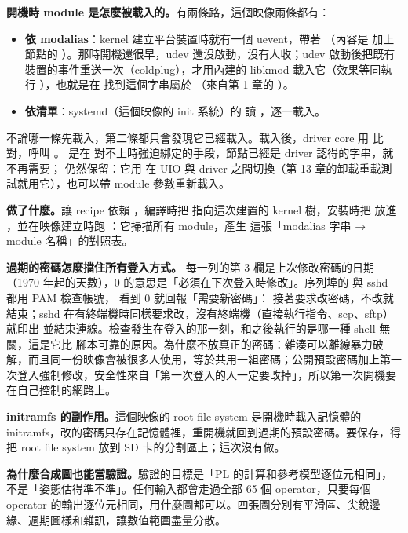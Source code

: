 \textbf{開機時 module 是怎麼被載入的。}有兩條路，這個映像兩條都有：
\begin{itemize}
\item \textbf{依 modalias}：kernel 建立平台裝置時就有一個 uevent，帶著 （內容是  加上節點的 ）。那時開機還很早，udev 還沒啟動，沒有人收；udev 啟動後把既有裝置的事件重送一次（coldplug），才用內建的 libkmod 載入它（效果等同執行 ），也就是在  找到這個字串屬於 （來自第 1 章的 ）。
\item \textbf{依清單}：systemd（這個映像的 init 系統）的  讀 ，逐一載入。
\end{itemize}
不論哪一條先載入，第二條都只會發現它已經載入。載入後，driver core 用  比對，呼叫 。 是在  對不上時強迫綁定的手段，節點已經是 driver 認得的字串，就不再需要； 仍然保留：它用  在 UIO 與 driver 之間切換（第 13 章的卸載重載測試就用它），也可以帶 module 參數重新載入。

\textbf{ 做了什麼。}讓 recipe 依賴 ，編譯時把  指向這次建置的 kernel 樹，安裝時把  放進 ，並在映像建立時跑 ：它掃描所有 module，產生  這張「modalias 字串 → module 名稱」的對照表。

\textbf{過期的密碼怎麼擋住所有登入方式。} 每一列的第 3 欄是上次修改密碼的日期（1970 年起的天數），0 的意思是「必須在下次登入時修改」。序列埠的  與 sshd 都用 PAM 檢查帳號， 看到 0 就回報「需要新密碼」： 接著要求改密碼，不改就結束；sshd 在有終端機時同樣要求改，沒有終端機（直接執行指令、scp、sftp）就印出  並結束連線。檢查發生在登入的那一刻，和之後執行的是哪一種 shell 無關，這是它比  腳本可靠的原因。為什麼不放真正的密碼：雜湊可以離線暴力破解，而且同一份映像會被很多人使用，等於共用一組密碼；公開預設密碼加上第一次登入強制修改，安全性來自「第一次登入的人一定要改掉」，所以第一次開機要在自己控制的網路上。

\textbf{initramfs 的副作用。}這個映像的 root file system 是開機時載入記憶體的 initramfs，改的密碼只存在記憶體裡，重開機就回到過期的預設密碼。要保存，得把 root file system 放到 SD 卡的分割區上；這次沒有做。

\textbf{為什麼合成圖也能當驗證。}驗證的目標是「PL 的計算和參考模型逐位元相同」，不是「姿態估得準不準」。任何輸入都會走過全部 65 個 operator，只要每個 operator 的輸出逐位元相同，用什麼圖都可以。四張圖分別有平滑區、尖銳邊緣、週期圖樣和雜訊，讓數值範圍盡量分散。


